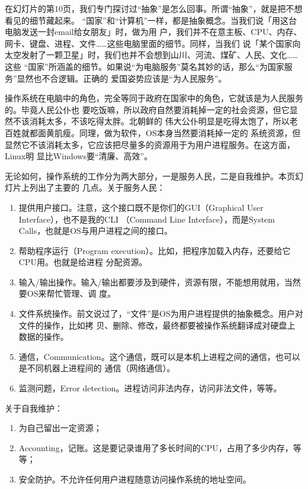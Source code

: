 \documentclass{wx672ctexart}
\begin{document}
在幻灯片的第10页，我们专门探讨过“抽象”是怎么回事。所谓“抽象”，就是把不想看见的细节藏起来。
“国家”和“计算机”一样，都是抽象概念。当我们说「用这台电脑发送一封email给女朋友」时，做为用
户，我们并不在意主板、CPU、内存、网卡、键盘、进程、文件……这些电脑里面的细节。同样，当我们
说「某个国家向太空发射了一颗卫星」时，我们也并不会想到山川、河流、煤矿、人民、文化……  这些
“国家”所涵盖的细节。如果说“为电脑服务”莫名其妙的话，那么“为国家服务”显然也不合逻辑。正确的
爱国姿势应该是“为人民服务”。

操作系统在电脑中的角色，完全等同于政府在国家中的角色，它就该是为人民服务的。毕竟人民公仆也
要吃饭嘛，所以政府自然要消耗掉一定的社会资源，但它显然不该消耗太多，不该吃得太胖。北朝鲜的
伟大公仆明显是吃得太饱了，所以老百姓就都面黄肌瘦。同理，做为软件，OS本身当然要消耗掉一定的
系统资源，但显然它不该消耗太多，它应该把尽量多的资源用于为用户进程服务。在这方面，Linux明
显比Windows要“清廉、高效”。

无论如何，操作系统的工作分为两大部分，一是服务人民，二是自我维护。本页幻灯片上列出了主要的
几点。关于服务人民：
\begin{enumerate}
\item 提供用户接口。注意，这个接口既不是你们的GUI（Graphical User Interface），也不是我的CLI
（Command Line Interface），而是System Calls，也就是OS与用户进程之间的接口。
\item 帮助程序运行（Program execution）。比如，把程序加载入内存，还要给它CPU用。也就是给进程
分配资源。
\item 输入/输出操作。输入/输出都要涉及到硬件，资源有限，不能想用就用，当然要OS来帮忙管理、调
度。
\item 文件系统操作。前文说过了，“文件”是OS为用户进程提供的抽象概念。用户对文件的操作，比如拷
贝、删除、修改，最终都要被操作系统翻译成对硬盘上数据的操作。
\item 通信，Communication。这个通信，既可以是本机上进程之间的通信，也可以是不同机器上进程间的
通信（网络通信）。
\item 监测问题，Error detection。进程访问非法内存，访问非法文件，等等。
\end{enumerate}

关于自我维护：
\begin{enumerate}
\item 为自己留出一定资源；
\item Accounting，记账。这是要记录谁用了多长时间的CPU，占用了多少内存，等等；
\item 安全防护。不允许任何用户进程随意访问操作系统的地址空间。
\end{enumerate}
\end{document}
